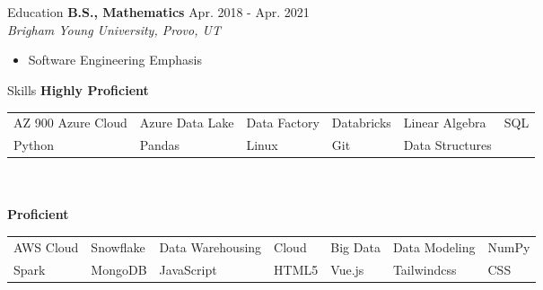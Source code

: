 \documentclass{resume} %
\begin{document}
\\~\\

\begin{rSection}{Education}
{\bf B.S., Mathematics }\hfill {Apr. 2018 - Apr. 2021} \\
\textit{Brigham Young University, Provo, UT}
\begin{itemize}
    \item Software Engineering Emphasis
\end{itemize}
\end{rSection}

\begin{rSection}{Skills}
    \textbf{Highly Proficient}\\
        \begin{tabular}{ l l l l l l }
            AZ 900 Azure Cloud & Azure Data Lake & Data Factory & Databricks & Linear Algebra & SQL \\
            Python & Pandas & Linux & Git & Data Structures  
        \end{tabular}\\\\
    \textbf{Proficient}\\
        \begin{tabular}{ l l l l l l l }
            AWS Cloud & Snowflake & Data Warehousing & Cloud & Big Data & Data Modeling & NumPy \\
            Spark & MongoDB & JavaScript & HTML5 & Vue.js &  Tailwindcss & CSS
        \end{tabular}
\end{rSection}
\end{document}

